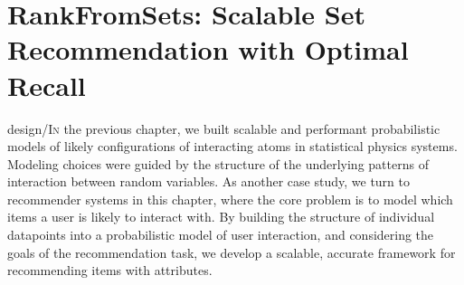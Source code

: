 \chapter{RankFromSets: Scalable Set Recommendation with Optimal Recall}
\label{ch:rfs}
\lettrine[image=true,lines=3]{design/I}{n} the previous chapter, we built scalable and performant probabilistic models of likely configurations of interacting atoms in statistical physics systems. Modeling choices were guided by the structure of the underlying patterns of interaction between random variables. As another case study, we turn to recommender systems in this chapter, where the core problem is to model which items a user is likely to interact with. By building the structure of individual datapoints into a probabilistic model of user interaction, and considering the goals of the recommendation task, we develop a scalable, accurate framework for recommending items with attributes.